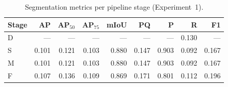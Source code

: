 \begin{table}[t]
\centering
\caption{Segmentation metrics per pipeline stage (Experiment~1).}
\label{tab:exp1-per-stage}
\begin{tabular}{lrrrrrrrr}
\toprule
Stage & AP & AP$_{50}$ & AP$_{75}$ & mIoU & PQ & P & R & F1 \\
\midrule
D & --- & --- & --- & --- & --- & --- & 0.130 & --- \\
S & 0.101 & 0.121 & 0.103 & 0.880 & 0.147 & 0.903 & 0.092 & 0.167 \\
M & 0.101 & 0.121 & 0.103 & 0.880 & 0.147 & 0.903 & 0.092 & 0.167 \\
F & 0.107 & 0.136 & 0.109 & 0.869 & 0.171 & 0.801 & 0.112 & 0.196 \\
\bottomrule
\end{tabular}
\end{table}